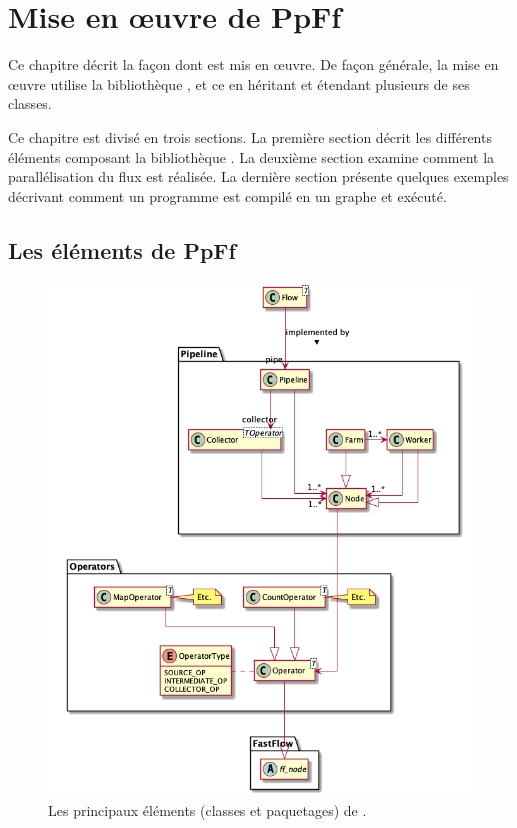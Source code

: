 
\chapter{Mise en \oe{}uvre de PpFf}
\label{implementation.chap}


Ce chapitre décrit la fa\c{c}on dont  est mis en \oe{}uvre.
%
De fa\c{c}on g\'en\'erale, la mise en \oe{}uvre utilise la biblioth\`eque , et ce en h\'eritant et \'etendant plusieurs de ses classes.

Ce chapitre est divis\'e en trois sections.
%
La premi\`ere section d\'ecrit les diff\'erents éléments composant la biblioth\`eque . La deuxi\`eme section examine comment la parall\'elisation du flux est r\'ealis\'ee. La derni\`ere section pr\'esente quelques exemples d\'ecrivant comment un programme \PpFf{} est compil\'e en un graphe  et ex\'ecut\'e.


\section{Les \'el\'ements de {PpFf}}

\begin{figure}
\centering
         \includegraphics[width=1.0\textwidth]{Figures/vueEnsemble.png}
      \caption{Les principaux éléments (classes et paquetages) de .}
       \label{All.fig}
\end{figure}

